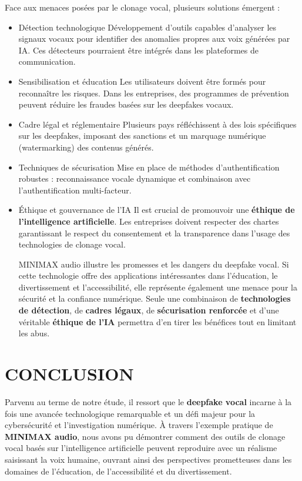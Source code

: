 \documentclass[memoire, 12pt]{report}
\begin{document}
Face aux menaces posées par le clonage vocal, plusieurs solutions émergent :
\begin{itemize}
\item Détection technologique
Développement d’outils capables d’analyser les signaux vocaux pour identifier des anomalies propres aux voix générées par IA.  
Ces détecteurs pourraient être intégrés dans les plateformes de communication.
\item Sensibilisation et éducation
Les utilisateurs doivent être formés pour reconnaître les risques.  
Dans les entreprises, des programmes de prévention peuvent réduire les fraudes basées sur les deepfakes vocaux.
\item Cadre légal et réglementaire
Plusieurs pays réfléchissent à des lois spécifiques sur les deepfakes, imposant des sanctions et un marquage numérique (watermarking) des contenus générés.
\item Techniques de sécurisation
Mise en place de méthodes d’authentification robustes : reconnaissance vocale dynamique et combinaison avec l’authentification multi-facteur.
\item Éthique et gouvernance de l’IA
Il est crucial de promouvoir une \textbf{éthique de l’intelligence artificielle}.  
Les entreprises doivent respecter des chartes garantissant le respect du consentement et la transparence dans l’usage des technologies de clonage vocal.


MINIMAX audio illustre les promesses et les dangers du deepfake vocal.  
Si cette technologie offre des applications intéressantes dans l’éducation, le divertissement et l’accessibilité, 
elle représente également une menace pour la sécurité et la confiance numérique.  
Seule une combinaison de \textbf{technologies de détection}, de \textbf{cadres légaux}, de \textbf{sécurisation renforcée} et d’une véritable \textbf{éthique de l’IA} permettra d’en tirer les bénéfices tout en limitant les abus.

\end{itemize}

\newpage
\section*{\center \textbf{CONCLUSION}}
Parvenu au terme de notre étude, il ressort que le \textbf{deepfake vocal} incarne à la fois une avancée technologique remarquable et un défi majeur pour la cybersécurité et l’investigation numérique. 
À travers l’exemple pratique de \textbf{MINIMAX audio}, nous avons pu démontrer comment des outils de clonage vocal basés sur l’intelligence artificielle peuvent reproduire avec un réalisme saisissant la voix humaine, ouvrant ainsi des perspectives prometteuses dans les domaines de l’éducation, de l’accessibilité et du divertissement.
\end{document}
